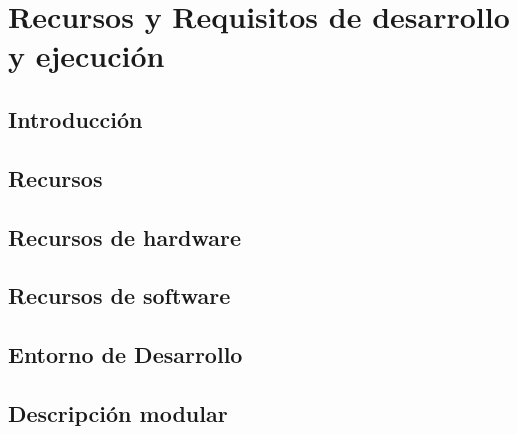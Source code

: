 \chapter{Recursos y Requisitos de desarrollo y ejecución}\label{cap-requisitos-desarrollo-ejecucion}

\section{Introducción}


\section{Recursos}
	

\section{Recursos de hardware}

\section{Recursos de software}


	
\section{Entorno de Desarrollo}



\section{Descripción modular}

